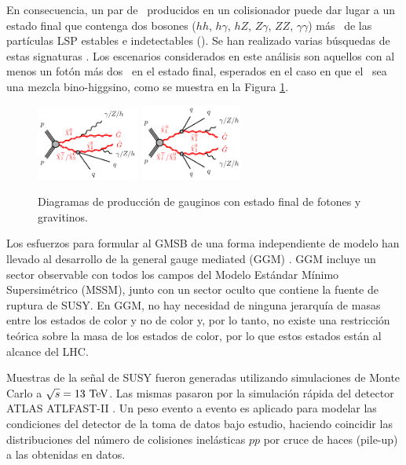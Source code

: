En consecuencia, un par de \ninoone\  producidos en un colisionador puede dar lugar a un estado final que contenga dos bosones ($hh$, $h\gamma$, $hZ$, $Z\gamma$, $ZZ$, $\gamma\gamma$) más \met\ de las partículas LSP estables e indetectables (\gravino). Se han realizado varias búsquedas de estas signaturas \cite{SUSY-2011-12, SUSY-2012-12,EXOT-2010-06,SUSY-2011-04,ATLAS-CONF-2012-144,CMS-SUS-10-002 ,CMS-SUS-11-002,CMS-SUS-14-009,SUSY-2014-01,CMS-SUS-14-004,SUSY-2014-08}.
Los escenarios considerados en este análisis son aquellos con al menos un fotón
más dos \gravino\ en el estado final, esperados en el caso en que el \ninoone\ sea una mezcla bino-higgsino, como se muestra en la Figura \ref{fig:GGM_diagrams}.

\begin{figure}
  \centering
  \includegraphics[width=0.3\textwidth]{images/N1N2C1-qqZhphGG-GGM.pdf}%
  \includegraphics[width=0.3\textwidth]{images/C1C1N2-qqqqZhphGG-GGM.pdf}
  \caption{Diagramas de producción de gauginos con estado final de fotones y gravitinos.}
  \label{fig:GGM_diagrams}
\end{figure}

Los esfuerzos para formular al GMSB de una forma independiente de modelo han llevado al desarrollo de la general gauge mediated (GGM) \cite{Cheung:2007es,Meade:2008wd}. GGM incluye un sector observable con todos los campos del Modelo Estándar Mínimo Supersimétrico (MSSM), junto con un sector oculto que contiene la fuente de ruptura de SUSY.
En GGM, no hay necesidad de ninguna jerarquía de masas entre los estados de color y no de color y, por lo tanto, no existe una restricción teórica sobre la masa de los estados de color, por lo que estos estados están al alcance del LHC. 

Muestras de la señal de SUSY fueron generadas utilizando simulaciones de Monte Carlo a $\sqrt{s} = 13\ \text{TeV}$. Las mismas pasaron por la simulación rápida del detector ATLAS \textsc{ATLFAST-II} \cite{Richter-Was:683751}. Un peso evento a evento es aplicado para modelar las condiciones del detector de la toma de datos bajo estudio, haciendo coincidir las distribuciones del número de colisiones inelásticas $pp$ por cruce de haces (pile-up) a las obtenidas en datos.

